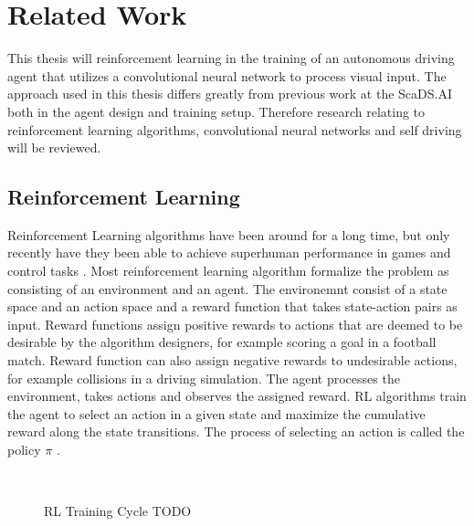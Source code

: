 \chapter{Related Work}
\label{cha:Related Work}

This thesis will reinforcement learning in the training of an autonomous driving agent that utilizes a convolutional neural network to process visual input. The approach used in this thesis differs greatly from previous work at the ScaDS.AI \autocite{maximilian} both in the agent design and training setup. Therefore research relating to reinforcement learning algorithms, convolutional neural networks and self driving will be reviewed. 



\section{Reinforcement Learning}

Reinforcement Learning algorithms have been around for a long time, but only recently have they been able to achieve superhuman performance in games and control tasks \autocite{atari}. Most reinforcement learning algorithm formalize the problem as consisting of an environment and an agent. The environemnt consist of a state space and an action space and a reward function that takes state-action pairs as input. Reward functions assign positive rewards to actions that are deemed to be desirable by the algorithm designers, for example scoring a goal in a football match. Reward function can also assign negative rewards to undesirable actions, for example collisions in a driving simulation. The agent processes the environment, takes actions and observes the assigned reward. RL algorithms train the agent to select an action in a given state and maximize the cumulative reward along the state transitions. The process of selecting an action is called the policy $\pi$ \autocite{rlbook2020}. 

\begin{figure}
    \centering
    \qquad
    \\
    \caption{RL Training Cycle TODO}
\end{figure}

